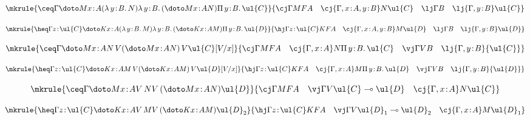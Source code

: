 \begin{proposition}
\vspace{0.1cm}

\[
\mkrule
{\ceq \Gamma {\doto M {x \!:\! A} {} {(\lambda\, y \!:\! B .\, N)}} {\lambda \, y \!:\! B .\, (\doto M {x \!:\! A} {} N)} {\Pi\, y \!:\! B .\, \ul{C}}}
{\cj \Gamma M {FA} \quad \cj {\Gamma, x \!:\! A, y \!:\! B} N {\ul{C}} \quad \lj \Gamma B \quad \lj {\Gamma, y \!:\! B} \ul{C}}
\]

\vspace{0.1cm}

\[
\mkrule
{\heq \Gamma {z \!:\! \ul{C}} {\doto K {x \!:\! A} {} {(\lambda\, y \!:\! B .\, M)}} {\lambda \, y \!:\! B .\, (\doto K {x \!:\! A} {} M)} {\Pi\, y \!:\! B .\, \ul{D}}}
{\hj \Gamma {z \!:\! \ul{C}} K {FA} \quad \cj {\Gamma, x \!:\! A, y \!:\! B} M {\ul{D}} \quad \lj \Gamma B \quad \lj {\Gamma, y \!:\! B} \ul{D}}
\]

\vspace{0.1cm}

\[
\mkrule
{\ceq \Gamma {\doto M {x \!:\! A} {} {N\, V}} {(\doto M {x \!:\! A} {} N)\, V} {\ul{C}[V/x]}}
{\cj \Gamma M {FA} \quad \cj {\Gamma, x \!:\! A} N {\Pi\, y \!:\! B .\, \ul{C}} \quad \vj \Gamma V B \quad \lj {\Gamma, y \!:\! B} {\ul{C}}}
\]

\vspace{0.1cm}

\[
\mkrule
{\heq \Gamma {z \!:\! \ul{C}} {\doto K {x \!:\! A} {} {M\, V}} {(\doto K {x \!:\! A} {} M)\, V} {\ul{D}[V/x]}}
{\hj \Gamma {z \!:\! \ul{C}} K {FA} \quad \cj {\Gamma, x \!:\! A} M {\Pi\, y \!:\! B .\, \ul{D}} \quad \vj \Gamma V B \quad \lj {\Gamma, y \!:\! B} {\ul{D}}}
\]

\vspace{0.1cm}

\[
\mkrule
{\ceq \Gamma {\doto M {x \!:\! A} {} {V\, N}} {V\, (\doto M {x \!:\! A} {} {N})} {\ul{D}}}
{\cj \Gamma M {FA} \quad \vj \Gamma {V} {\ul{C} \multimap \ul{D}} \quad \cj {\Gamma, x \!:\! A} N {\ul{C}}}
\]

\vspace{0.1cm}

\[
\mkrule
{\heq \Gamma {z \!:\! \ul{C}} {\doto K {x \!:\! A} {} {V\, M}} {V\, (\doto K {x \!:\! A} {} {M})} {\ul{D}_2}}
{\hj \Gamma {z \!:\! \ul{C}} K {FA} \quad \vj \Gamma {V} {\ul{D}_1 \multimap \ul{D}_2} \quad \cj {\Gamma, x \!:\! A} M {\ul{D}_1}}
\]
\end{proposition}

